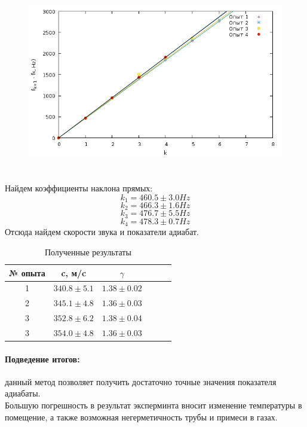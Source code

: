 \documentclass[a4paper]{article}
\begin{document}
	\begin{figure}[ht!]
		\centering
		\includegraphics[height=80mm]{plot.png}
	\end{figure}
	Найдем коэффициенты наклона прямых:
	\begin{equation}
	k_1=460.5\pm 3.0 Hz
	\end{equation}
	\begin{equation}
	k_2=466.3\pm 1.6 Hz
	\end{equation}
	\begin{equation}
	k_3=476.7\pm 5.5 Hz
	\end{equation}
	\begin{equation}
	k_4=478.3\pm 0.7 Hz
	\end{equation}
	Отсюда найдем скорости звука и показатели адиабат.
	\begin{table}[h!]
 		\centering
		\begin{tabular}{|c|c|c|c|c|c|}
		\hline
		№ опыта & c, м/c & $\gamma$ \\
		\hline
		1 & $340.8 \pm 5.1$ & $1.38 \pm 0.02$\\
		\hline
		2 & $345.1 \pm 4.8$ & $1.36 \pm 0.03$\\
		\hline
		3 & $352.8 \pm 6.2$ & $1.38 \pm 0.04$\\
		\hline
		3 & $354.0 \pm 4.8$ & $1.36 \pm 0.03$\\
		\hline
		\end{tabular}
  		\caption{Полученные результаты}
	\end{table}
	\paragraph{Подведение итогов:}
	данный метод позволяет получить достаточно точные значения показателя адиабаты.\\
	Большую погрешность в результат эксперминта вносит изменение температуры в помещение, а также возможная негерметичность трубы и примеси в газах.
\end{document}
